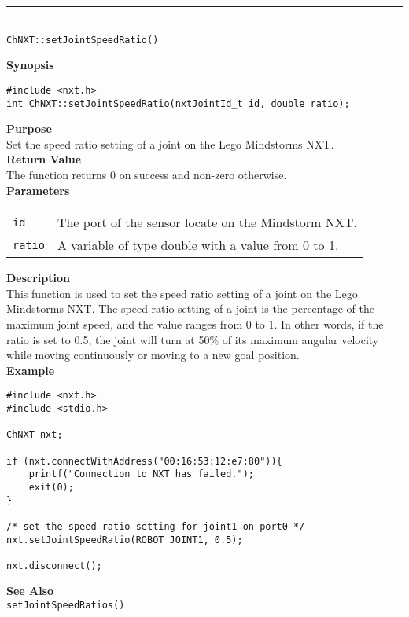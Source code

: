 \noindent
\vspace{5pt}
\rule{4.5in}{0.015in}\\
\noindent
{\LARGE \texttt{ChNXT::setJointSpeedRatio()} }\\


\noindent
{\bf Synopsis}
\vspace{-8pt}
\begin{verbatim}
#include <nxt.h>
int ChNXT::setJointSpeedRatio(nxtJointId_t id, double ratio);
\end{verbatim}

\noindent
{\bf Purpose}\\
Set the speed ratio setting of a joint on the Lego Mindstorms NXT.\\

\noindent
{\bf Return Value}\\
The function returns 0 on success and non-zero otherwise.\\

\noindent
{\bf Parameters}\\
\vspace{-0.1in}
\begin{description}
\item
\begin{tabular}{ p{20mm}p{135mm} }
\texttt{id}&The port of the sensor locate on the Mindstorm NXT.\\
\texttt{ratio}&A variable of type double with a value from 0 to 1.\\
\end{tabular}
\end{description}

\noindent
{\bf Description}\\
This function is used to set the speed ratio setting of a joint on
the Lego Mindstorms NXT. The speed ratio setting of a joint is the
percentage of the maximum joint speed, and the value ranges from 
0 to 1. In other words, if the ratio is set to 0.5, the joint will
turn at 50\% of its maximum angular velocity while moving 
continuously or moving to a new goal position.\\

\noindent
{\bf Example}
\begin{verbatim}
#include <nxt.h> 
#include <stdio.h>

ChNXT nxt;

if (nxt.connectWithAddress("00:16:53:12:e7:80")){
    printf("Connection to NXT has failed.");
    exit(0);
}
    
/* set the speed ratio setting for joint1 on port0 */
nxt.setJointSpeedRatio(ROBOT_JOINT1, 0.5);

nxt.disconnect();
\end{verbatim}
\noindent
{\bf See Also}\\
\texttt{setJointSpeedRatios()}\\
